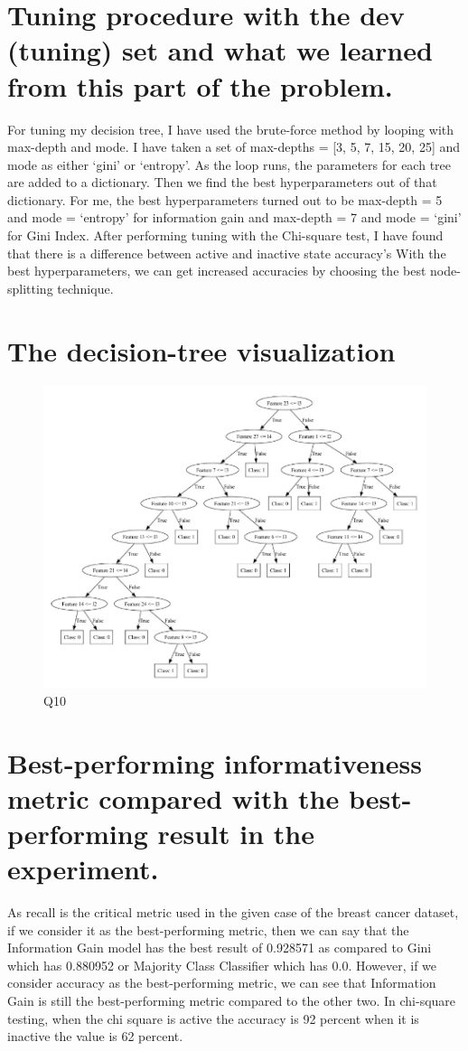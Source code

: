 \documentclass[a4paper]{article}
\begin{document}
\section*{Tuning procedure with the dev (tuning) set and what we learned from this part of the problem.}
For tuning my decision tree, I have used the brute-force method by looping with max-depth and mode. I have taken a set of max-depths = [3, 5, 7, 15, 20, 25] and mode as either ‘gini’ or ‘entropy’. As the loop runs, the parameters for each tree are added to a dictionary. Then we find the best hyperparameters out of that dictionary. For me, the best hyperparameters turned out to be max-depth = 5 and mode = ‘entropy’ for information gain and max-depth = 7 and mode = ‘gini’ for Gini Index. After performing tuning with the Chi-square test, I have found that there is a difference between active and inactive state accuracy's With the best hyperparameters, we can get increased accuracies by choosing the best node-splitting technique.

\section*{The decision-tree visualization}
\newpage
\begin{figure}
    \centering
    \includegraphics[width=0.5\linewidth]{dt.PNG}
    \caption{Q10}
    \label{fig:enter-label}
\end{figure}

\section*{Best-performing informativeness metric compared with the best-performing result in the experiment.}
As recall is the critical metric used in the given case of the breast cancer dataset, if we consider it as the best-performing metric, then we can say that the Information Gain model has the best result of 0.928571 as compared to Gini which has 0.880952 or Majority Class Classifier which has 0.0. However, if we consider accuracy as the best-performing metric, we can see that Information Gain is still the best-performing metric compared to the other two. In chi-square testing, when the chi square is active the accuracy is 92 percent when it is inactive the value is 62 percent.
\end{document}
